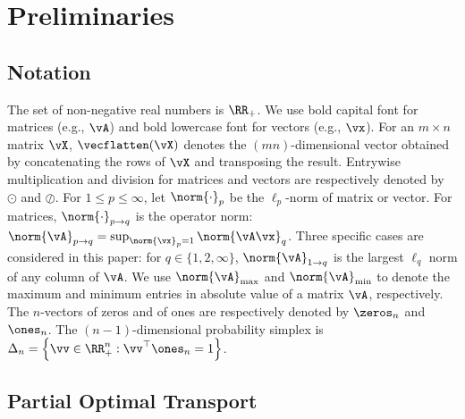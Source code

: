\section{Preliminaries}

\subsection{Notation} 

The set of non-negative real numbers is $\RR_+$. We use bold capital font for matrices (e.g., $\vA$) and bold lowercase font for vectors (e.g., $\vx$). For an $m \times n$ matrix $\vX$, $\vecflatten(\vX)$ denotes the $(m n)$-dimensional vector obtained by concatenating the rows of $\vX$ and transposing the result. Entrywise multiplication and division for matrices and vectors are respectively denoted by $\odot$ and $\oslash$. For $1 \leq p \leq \infty$, let $\norm{\cdot}_p$ be the $\ell_p$-norm of matrix or vector. For matrices, $\norm{\cdot}_{p \rightarrow q}$ is the operator norm: $\norm{\vA}_{p \rightarrow q} = \sup_{\norm{\vx}_p = 1} \norm{\vA \vx}_q$. Three specific cases are considered in this paper: for $q \in \{1, 2, \infty\}$, $\norm{\vA}_{1 \rightarrow q}$ is the largest $\ell_q$ norm of any column of $\vA$. We use $\norm{\vA}_{\max}$ and $\norm{\vA}_{\min}$ to denote the maximum and minimum entries in absolute value of a matrix $\vA$, respectively. The $n$-vectors of zeros and of ones are respectively denoted by $\zeros_n$ and $\ones_n$. The $(n-1)$-dimensional probability simplex is $\Delta_n = \left\{ \vv \in \RR_+^n : \vv^\top \ones_n = 1 \right\}$. 

\subsection{Partial Optimal Transport} 



